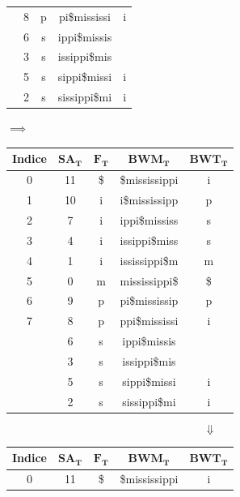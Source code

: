 \begin{esempio}
\begin{table}[H]
\begin{tabular}{c|c|c|c|c}
      {\color{nordred}{7}} & 8 & p & {\color{nordred}{p}}pi\$mississi & i\\
      {\color{nordred}{8}} & 6 & s & {\color{nordred}{s}}ippi\$missis
      & {\color{nordgreen}{s}}\\
      {\color{nordred}{9}} & 3 & s & {\color{nordred}{s}}issippi\$mis
      & {\color{nordgreen}{s}}\\
      {\color{nordred}{10}} & 5 & s & {\color{nordred}{s}}sippi\$missi & i\\
      {\color{nordred}{11}} & 2 & s & {\color{nordred}{s}}sissippi\$mi & i\\
    \end{tabular}
    $\implies$
    \begin{tabular}{c|c|c|c|c} 
      \textbf{Indice} & $\mathbf{SA_T}$ & $\mathbf{F_T}$ & $\mathbf{BWM_T}$
      & $\mathbf{BWT_T}$\\ 
      \hline
      0 & 11 & \$ & \$mississippi & i\\
      1 & 10 & i & i\$mississipp & p\\
      2 & 7 & i & ippi\$mississ & s\\
      3 & 4 & i & issippi\$miss & s\\
      4 & 1 & i & ississippi\$m & m\\
      5 & 0 & m & mississippi\$ & \$\\
      6 & 9 & p & pi\$mississip & p\\
      7 & 8 & p & ppi\$mississi & i\\
      {\color{nordred}{8}} & 6 & s & {\color{nordred}{s}}ippi\$missis
      & {\color{nordgreen}{s}}\\
      {\color{nordred}{9}} & 3 & s & {\color{nordred}{s}}issippi\$mis
      & {\color{nordgreen}{s}}\\
      {\color{nordred}{10}} & 5 & s & {\color{nordred}{s}}sippi\$missi & i\\
      {\color{nordred}{11}} & 2 & s & {\color{nordred}{s}}sissippi\$mi & i\\
    \end{tabular}
  \end{table}
  \[\Downarrow\]
  \begin{table}[H]
    \centering
    \scriptsize
    \begin{tabular}{c|c|c|c|c} 
      \textbf{Indice} & $\mathbf{SA_T}$ & $\mathbf{F_T}$ & $\mathbf{BWM_T}$
      & $\mathbf{BWT_T}$\\ 
      \hline
      0 & 11 & \$ & \$mississippi & i\\

\end{tabular}
\end{table}
\end{esempio}
